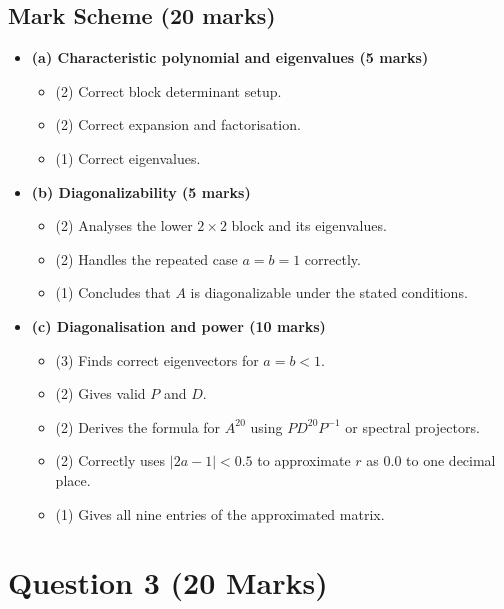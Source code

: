 \documentclass[12pt]{article}
\begin{document}
\newpage
\subsection{Mark Scheme (20 marks)}
\begin{itemize}[leftmargin=1.6em]
  \item \textbf{(a) Characteristic polynomial and eigenvalues (5 marks)}
  \begin{itemize}[leftmargin=1.6em]
    \item (2) Correct block determinant setup.
    \item (2) Correct expansion and factorisation.
    \item (1) Correct eigenvalues.
  \end{itemize}
  \item \textbf{(b) Diagonalizability (5 marks)}
  \begin{itemize}[leftmargin=1.6em]
    \item (2) Analyses the lower $2\times2$ block and its eigenvalues.
    \item (2) Handles the repeated case $a=b=1$ correctly.
    \item (1) Concludes that $A$ is diagonalizable under the stated conditions.
  \end{itemize}
  \item \textbf{(c) Diagonalisation and power (10 marks)}
  \begin{itemize}[leftmargin=1.6em]
    \item (3) Finds correct eigenvectors for $a=b<1$.
    \item (2) Gives valid $P$ and $D$.
    \item (2) Derives the formula for $A^{20}$ using $PD^{20}P^{-1}$ or spectral projectors.
    \item (2) Correctly uses $|2a-1|<0.5$ to approximate $r$ as $0.0$ to one decimal place.
    \item (1) Gives all nine entries of the approximated matrix.
  \end{itemize}
\end{itemize}

\newpage
\section{Question 3 \hfill (20 Marks)}
\end{document}

